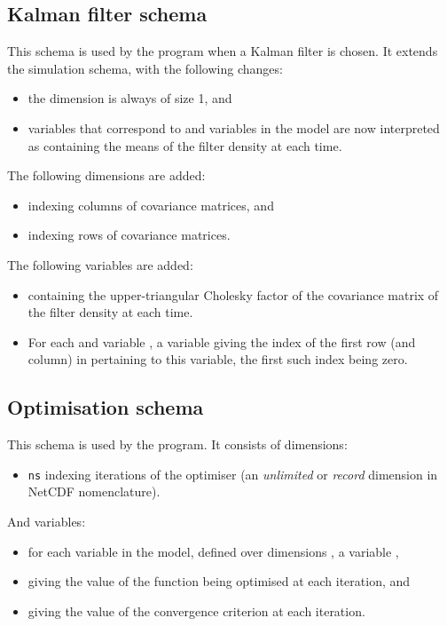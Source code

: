 \subsection{Kalman filter schema}

This schema is used by the  program when a Kalman filter is
chosen. It extends the simulation schema, with the following changes:
\begin{itemize}
\item the  dimension is always of size 1, and
\item variables that correspond to  and  variables
  in the model are now interpreted as containing the means of the filter
  density at each time.
\end{itemize}

The following dimensions are added:
\begin{itemize}
\item {} indexing columns of covariance matrices, and
\item {} indexing rows of covariance matrices.
\end{itemize}

The following variables are added:
\begin{itemize}
\item {} containing the upper-triangular Cholesky
  factor of the covariance matrix of the filter density at each time.
\item For each  and  variable , a
  variable  giving the index of the first row (and
  column) in  pertaining to this variable, the first such index being
  zero.
\end{itemize}

\subsection{Optimisation schema}

This schema is used by the  program. It consists of
dimensions:
\begin{itemize}
\item \texttt{ns} indexing iterations of the optimiser (an \emph{unlimited} or
  \emph{record} dimension in NetCDF nomenclature).
\end{itemize}
And variables:
\begin{itemize}
\item for each  variable  in the model,
  defined over dimensions , a variable
  ,
\item {} giving the value of the function being
  optimised at each iteration, and
\item {} giving the value of the convergence criterion
  at each iteration.
\end{itemize}


